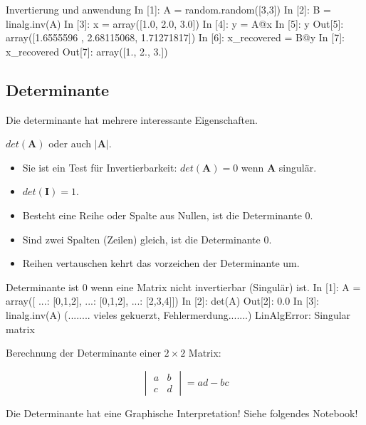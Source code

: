 \begin{python}{Invertierung und anwendung}
In [1]: A = random.random([3,3])
In [2]: B = linalg.inv(A)
In [3]: x = array([1.0, 2.0, 3.0])
In [4]: y = A@x
In [5]: y
Out[5]: array([1.6555596 , 2.68115068, 1.71271817])
In [6]: x_recovered = B@y
In [7]: x_recovered
Out[7]: array([1., 2., 3.])
\end{python}



\subsection*{Determinante}\label{sub:determinant}
Die determinante hat mehrere interessante Eigenschaften. 

$det (\mathbf{A})$ oder auch $|\mathbf{A}|$. 

\begin{itemize}
    \item Sie ist ein Test für Invertierbarkeit: $det(\mathbf{A})=0$ wenn $\mathbf{A}$ singulär.
    \item $det (\mathbf{I}) = 1$.
    \item Besteht eine Reihe oder Spalte aus Nullen, ist die Determinante 0.
    \item Sind zwei Spalten (Zeilen) gleich, ist die Determinante 0.
    \item Reihen vertauschen kehrt das vorzeichen der Determinante um.
\end{itemize}

\begin{python}{Determinante ist 0 wenn eine Matrix nicht invertierbar (Singulär) ist.}
In [1]: A = array([
    ...: [0,1,2],
    ...: [0,1,2],
    ...: [2,3,4]])
In [2]: det(A)
Out[2]: 0.0
In [3]: linalg.inv(A)
(........ vieles gekuerzt, Fehlermerdung.......)
LinAlgError: Singular matrix
\end{python}

Berechnung der Determinante einer $2 \times 2 $ Matrix:

$$ \begin{vmatrix} a & b  \\
                    c & d 

 \end{vmatrix} = ad - bc$$

Die Determinante hat eine Graphische Interpretation! Siehe folgendes Notebook!




